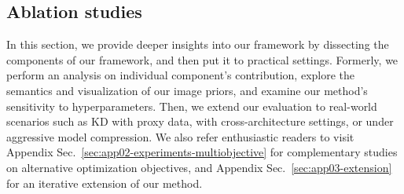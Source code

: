 \subsection{Ablation studies} \label{ssec:04-experiments-ablation}
\begin{foldable}
    In this section, we provide deeper insights into our framework by dissecting the components of our framework, and then put it to practical settings.
    Formerly, we perform an analysis on individual component's contribution, explore the semantics and visualization of our image priors, and examine our method's sensitivity to hyperparameters.
    Then, we extend our evaluation to real-world scenarios such as KD with proxy data, with cross-architecture settings, or under aggressive model compression.
    We also refer enthusiastic readers to visit Appendix Sec.~\ref{sec:app02-experiments-multiobjective} for complementary studies on alternative optimization objectives, and Appendix Sec.~\ref{sec:app03-extension} for an iterative extension of our method.
\end{foldable}


